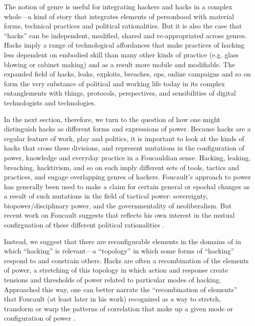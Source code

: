 \documentclass[10pt,letter,oneside]{scrartcl}
\begin{document}
The notion of genre is useful for integrating hackers and hacks in a complex
whole---a kind of story that integrates elements of personhood with material
forms, technical practices and political rationalities.  But it is also the case
that ``hacks'' can be independent, modified, shared and re-appropriated across
genres.  Hacks imply a range of technological affordances that make practices of
hacking less dependent on embodied skill than many other kinds of practice
(e.g. glass blowing or cabinet making) and as a result more mobile and
modifiable.  The expanded field of hacks, leaks, exploits, breaches, ops, online
campaigns and so on form the very substance of political and working life today
in its complex entanglements with things, protocols, perspectives, and
sensibilities of digital technologists and technologies.

In the next section, therefore, we turn to the question of how one might
distinguish hacks as different forms and expressions of power.  Because hacks
are a regular feature of work, play and politics, it is important to look at the
kinds of hacks that cross these divisions, and represent mutations in the
configuration of power, knowledge and everyday practice in a Foucauldian sense.
Hacking, leaking, breaching, hacktivism, and so on each imply different sets of
tools, tactics and practices, and engage overlapping genres of hackers.
Foucault's approach to power has generally been used to make a claim for certain
general or epochal changes as a result of such mutations in the field of
tactical power: sovereignty, biopower/disciplinary power, and the
governmentality of neoliberalism.  But recent work on Foucault suggests that
reflects his own interest in the mutual confirguation of these different
political rationalities \parencite{Macmillan2011a}.

Instead, we suggest that there are reconfigurable elements in the domains of in
which ``hacking'' is relevant---a ``topology'' in which some forms of
``hacking'' respond to and constrain others.  Hacks are often a recombination of
the elements of power, a stretching of this topology in which action and
response create tensions and thresholds of power related to particular modes of
hacking.  Approached this way, one can better narrate the ``recombination of
elements'' that Foucault (at least later in his work) recognized as a way to
stretch, transform or warp the patterns of correlation that make up a given
mode or configuration of power \parencite{Collier2009a}.
\end{document}
